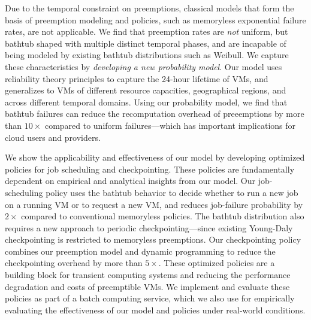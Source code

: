 \documentclass[sigconf]{acmart} %
\begin{document}
Due to the temporal constraint on preemptions, classical models that form the basis of preemption modeling and policies, such as memoryless exponential failure rates, are not applicable. 
We find that preemption rates are \emph{not} uniform, but bathtub shaped with multiple distinct temporal phases, and are incapable of being modeled by existing bathtub distributions such as Weibull.
We capture these characteristics by \emph{developing a new probability model}. 
Our model uses reliability theory principles to capture the 24-hour lifetime of VMs, and generalizes to VMs of different resource capacities, geographical regions, and across different temporal domains.
Using our probability model, we find that bathtub failures can reduce the recomputation overhead of preeemptions by more than  $10\times$ compared to uniform failures---which has important implications for cloud users and providers. 

We show the applicability and effectiveness of our model by developing optimized policies for job scheduling and checkpointing. 
These policies are fundamentally dependent on empirical and analytical insights from our model. 
Our job-scheduling policy uses the bathtub behavior to decide whether to run a new job on a running VM or to request a new VM, and reduces job-failure probability by $2\times$ compared to  conventional memoryless policies. 
The bathtub distribution also requires a new approach to periodic checkpointing---since existing Young-Daly~\cite{daly2006higher} checkpointing is restricted to memoryless preemptions. 
Our checkpointing policy combines our preemption model and dynamic programming to reduce the checkpointing overhead by more than $5\times$. 
These optimized policies are a building block for transient computing systems and reducing the performance degradation and costs of preemptible VMs. 
We implement and evaluate these policies as part of a batch computing service, which we also use for empirically evaluating the effectiveness of our model and policies under real-world conditions. 
\end{document}
